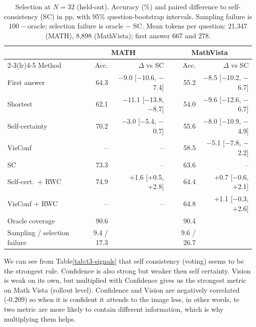 \documentclass{article}
\begin{document}
\begin{table}[t]
  \centering
  \footnotesize
  \caption{Selection at $N{=}32$ (held-out). Accuracy (\%) and paired difference to self-consistency (SC) in pp, with 95\% question-bootstrap intervals. Sampling failure is $100-$oracle; selection failure is oracle $-$ SC. Mean tokens per question: 21{,}347 (MATH), 8{,}898 (MathVista); first answer 667 and 278.}
  \label{tab:t3-methods}
  \begin{tabular}{lrrrr}
    \toprule
    & \multicolumn{2}{c}{MATH} & \multicolumn{2}{c}{MathVista} \\
    \cmidrule(lr){2-3}\cmidrule(lr){4-5}
    Method & Acc. & $\Delta$ vs SC & Acc. & $\Delta$ vs SC \\
    \midrule
    First answer & 64.3 & $-$9.0 [$-$10.6, $-$7.4] & 55.2 & $-$8.5 [$-$10.2, $-$6.7] \\
    Shortest & 62.1 & $-$11.1 [$-$13.8, $-$8.7] & 54.0 & $-$9.6 [$-$12.6, $-$6.7] \\
    Self-certainty & 70.2 & $-$3.0 [$-$5.4, $-$0.7] & 55.6 & $-$8.0 [$-$10.9, $-$4.9] \\
    VisConf & -- & -- & 58.5 & $-$5.1 [$-$7.8, $-$2.2] \\
    SC & 73.3 & -- & 63.6 & -- \\
    Self-cert.\ + RWC & 74.9 & +1.6 [+0.5, +2.8] & 64.4 & +0.7 [$-$0.6, +2.1] \\
    VisConf + RWC & -- & -- & 64.8 & +1.1 [$-$0.3, +2.6] \\
    \midrule
    Oracle coverage & 90.6 & & 90.4 & \\
    Sampling / selection failure & 9.4 / 17.3 & & 9.6 / 26.7 & \\
    \bottomrule
  \end{tabular}
\end{table}

We can see from Table\ref{tab:t3-signals} that self consistency (voting) seems to be the strongest rule. Confidence is also strong but weaker then self certainty.
Vision is weak on its own, but multiplied with Confidence gives us the strongest metric on Math Vista (rollout level).
Confidence and Vision are negatively correlated (-0.209) so when it is confident it attends to the image less, in other words, te two metric are more likely to contain different information, which is why multiplying them helps.
\end{document}
